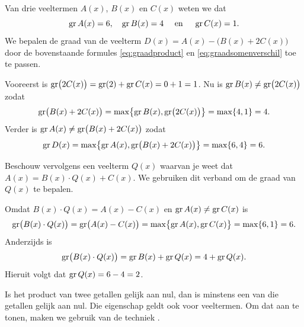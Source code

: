 \documentclass{ximera}
\begin{document}
\begin{voorbeeld}
Van drie veeltermen $A(x)$, $B(x)$ en $C(x)$ weten we dat
\[
\operatorname{gr} A(x) = 6, \quad \operatorname{gr} B(x) = 4 \quad \text{ en } \quad \operatorname{gr} C(x) = 1.
\]
We bepalen de graad van de veelterm $D(x) = A(x) - \bigl(B(x) + 2C(x)\bigr)$ door de bovenstaande formules \eqref{eq:graadproduct} en \eqref{eq:graadsomenverschil} toe te passen. 

Vooreerst is $\operatorname{gr}\bigl(2C(x)\bigr) = \operatorname{gr}(2) + \operatorname{gr} C(x) = 0 + 1 = 1$. Nu is $\operatorname{gr} B(x) \neq \operatorname{gr}\bigl(2C(x)\bigr)$ zodat
\[
\operatorname{gr} \bigl(B(x) + 2C(x)\bigr) = \max \bigl\{\operatorname{gr} B(x),\operatorname{gr}\bigl(2C(x)\bigr)\bigr\} = \max\{4,1\} = 4.
\]
Verder is $\operatorname{gr} A(x) \neq \operatorname{gr}\bigl(B(x) + 2C(x)\bigr)$ zodat 
\[
\operatorname{gr} D(x) = \max \bigl\{\operatorname{gr} A(x),\operatorname{gr}\bigl(B(x) + 2C(x)\bigr)\bigr\} = \max\{6,4\} = 6.
\]

Beschouw vervolgens een veelterm $Q(x)$ waarvan je weet dat $A(x) = B(x)\cdot Q(x) + C(x)$. We gebruiken dit verband om de graad van $Q(x)$ te bepalen. 

Omdat $B(x)\cdot Q(x) = A(x) - C(x)$ en $\operatorname{gr} A(x) \neq \operatorname{gr} C(x)$ is
\[
\operatorname{gr}\bigl(B(x)\cdot Q(x)\bigr) = \operatorname{gr}\bigl(A(x) - C(x)\bigr) = \max \bigl\{\operatorname{gr} A(x),\operatorname{gr} C(x)\bigr\} = \max\{6,1\} = 6.
\]
Anderzijds is 
\[
\operatorname{gr}\bigl(B(x)\cdot Q(x)\bigr) = \operatorname{gr} B(x) + \operatorname{gr} Q(x) = 4 + \operatorname{gr} Q(x).
\]
Hieruit volgt dat $\operatorname{gr} Q(x) = 6-4 = 2$. 
\end{voorbeeld}

Is het product van twee getallen gelijk aan nul, dan is minstens een van die getallen gelijk aan nul. Die eigenschap geldt ook voor veeltermen. Om dat aan te tonen, maken we gebruik van de techniek . 
 
\end{document}
